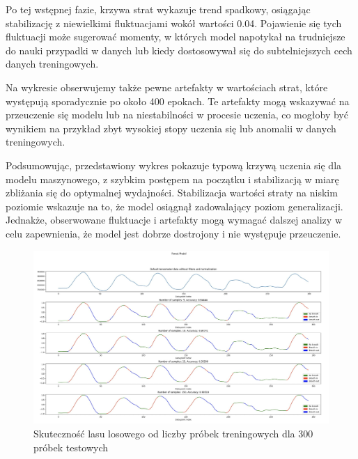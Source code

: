 \documentclass{article}
\begin{document}
Po tej wstępnej fazie, krzywa strat wykazuje trend spadkowy, osiągając stabilizację z niewielkimi fluktuacjami wokół wartości 0.04. Pojawienie się tych fluktuacji może sugerować momenty, w których model napotykał na trudniejsze do nauki przypadki w danych lub kiedy dostosowywał się do subtelniejszych cech danych treningowych.

Na wykresie obserwujemy także pewne artefakty w wartościach strat, które występują sporadycznie po około 400 epokach. Te artefakty mogą wskazywać na przeuczenie się modelu lub na niestabilności w procesie uczenia, co mogłoby być wynikiem na przykład zbyt wysokiej stopy uczenia się lub anomalii w danych treningowych.

Podsumowując, przedstawiony wykres pokazuje typową krzywą uczenia się dla modelu maszynowego, z szybkim postępem na początku i stabilizacją w miarę zbliżania się do optymalnej wydajności. Stabilizacja wartości straty na niskim poziomie wskazuje na to, że model osiągnął zadowalający poziom generalizacji. Jednakże, obserwowane fluktuacje i artefakty mogą wymagać dalszej analizy w celu zapewnienia, że model jest dobrze dostrojony i nie występuje przeuczenie.

\begin{figure}[H]
    \centering
    \includegraphics[width=\textwidth]{las_losowy/jak_sobie_radzi_las_losowy.png}
    \caption{Skuteczność lasu losowego od liczby próbek treningowych dla 300 próbek testowych}
    \label{fig:data_chart3}
\end{figure}
\end{document}
